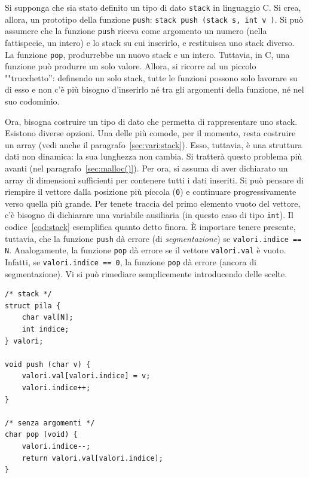 Si supponga che sia stato definito un tipo di dato \lstinline!stack! in linguaggio C. Si crea, allora, un prototipo della funzione \lstinline!push!: \lstinline!stack push (stack s, int v )!. Si può assumere che la funzione \lstinline!push! riceva come argomento un numero (nella fattispecie, un intero) e lo stack su cui inserirlo, e restituisca uno stack diverso. La funzione \lstinline!pop!, produrrebbe un nuovo stack e un intero. Tuttavia, in C, una funzione può produrre un solo valore. Allora, si ricorre ad un piccolo ""trucchetto'': definendo un solo stack, tutte le funzioni possono solo lavorare su di esso e non c'è più bisogno d'inserirlo né tra gli argomenti della funzione, né nel suo codominio.

Ora, bisogna costruire un tipo di dato che permetta di rappresentare uno stack. Esistono diverse opzioni. Una delle più comode, per il momento, resta costruire un array (vedi anche il paragrafo~\vref{sec:vari:stack}). Esso, tuttavia, è una struttura dati non dinamica: la sua lunghezza non cambia. Si tratterà questo problema più avanti (nel paragrafo~\vref{sec:malloc()}). Per ora, si assuma di aver dichiarato un array di dimensioni sufficienti per contenere tutti i dati inseriti. Si può pensare di riempire il vettore dalla posizione più piccola (\lstinline!0!) e continuare progressivamente verso quella più grande. Per tenete traccia del primo elemento vuoto del vettore, c'è bisogno di dichiarare una variabile ausiliaria (in questo caso di tipo \lstinline!int!). Il codice~\vref{cod:stack} esemplifica quanto detto finora. È importare tenere presente, tuttavia, che la funzione \lstinline!push! dà errore (di \emph{segmentazione}) se \lstinline!valori.indice == N!. Analogamente, la funzione \lstinline!pop! dà errore se il vettore \lstinline!valori.val! è vuoto. Infatti, se \lstinline!valori.indice == 0!, la funzione \lstinline!pop! dà errore (ancora di segmentazione). Vi si può rimediare semplicemente introducendo delle scelte.

\begin{lstlisting}[caption={[{\em Costruzione di uno stack.}]{\em Costruzione di uno stack. In questo esempio s'è usato un record per raggruppare la pila e l'intero che punta al primo elemento vuoto.}}, label={cod:stack}]
/* stack */
struct pila {
	char val[N];
	int indice;
} valori;

void push (char v) {
	valori.val[valori.indice] = v;
	valori.indice++;
}

/* senza argomenti */
char pop (void) {
	valori.indice--;
	return valori.val[valori.indice];
}
\end{lstlisting}

